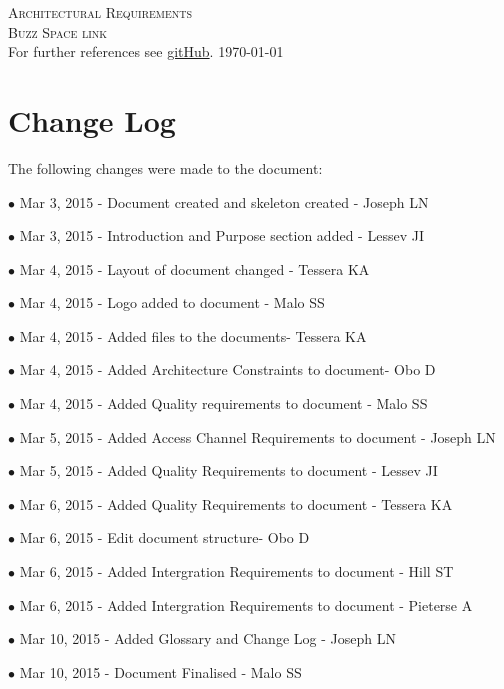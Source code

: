 \documentclass[a4paper,12pt]{report}
\begin{document}
\renewcommand{\thesection}{\arabic{section}}
\newpage
\begin{center}
\textsc{\LARGE Architectural Requirements}\\[1.5cm]
\textsc{\Large Buzz Space link}\\[0.5cm]
For further references see \href{https://github.com/COS301-Group-3-A-Phase2/Part2-Mini-Project.git}{gitHub}.
\today
\end{center}
\tableofcontents{}

\newpage

\section{Change Log}
\item The following changes were made to the document:
\item[$\bullet$]  Mar 3, 2015 -  Document created and skeleton created -  Joseph LN
\item[$\bullet$]  Mar 3, 2015 -  Introduction and Purpose section added - Lessev JI 
\item[$\bullet$]  Mar 4, 2015 -  Layout of document changed - Tessera KA
\item[$\bullet$]  Mar 4, 2015 -  Logo added to document - Malo SS
\item[$\bullet$]  Mar 4, 2015 -  Added files to the documents- Tessera KA
\item[$\bullet$]  Mar 4, 2015 -  Added Architecture Constraints to document- Obo D
\item[$\bullet$]  Mar 4, 2015 -  Added Quality requirements to document - Malo SS
\item[$\bullet$]  Mar 5, 2015 -  Added Access Channel Requirements to document -  Joseph LN 
\item[$\bullet$]  Mar 5, 2015 -  Added Quality Requirements to document - Lessev JI
\item[$\bullet$]  Mar 6, 2015 -  Added Quality Requirements to document - Tessera KA
\item[$\bullet$]  Mar 6, 2015 -  Edit document structure- Obo D
\item[$\bullet$]  Mar 6, 2015 -  Added Intergration Requirements to document -  Hill ST
\item[$\bullet$]  Mar 6, 2015 -  Added Intergration Requirements to document - Pieterse A 
\item[$\bullet$]  Mar 10, 2015 -  Added Glossary and Change Log -  Joseph LN 
\item[$\bullet$]  Mar 10, 2015 -  Document Finalised - Malo SS
\end{document}
